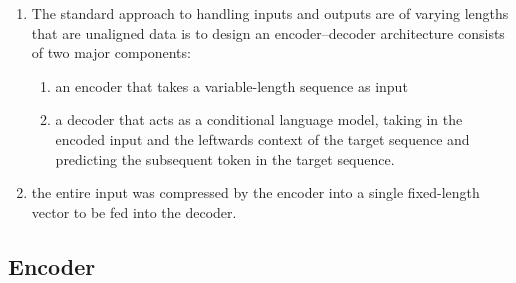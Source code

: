 \begin{enumerate}
    \item The standard approach to handling inputs and outputs are of varying lengths that are unaligned data is to design an encoder–decoder architecture consists of two major components: 
    \begin{enumerate}
        \item an encoder that takes a variable-length sequence as input
        
        \item a decoder that acts as a conditional language model, taking in the encoded input and the leftwards context of the target sequence and predicting the subsequent token in the target sequence.
    \end{enumerate}

    \item the entire input was compressed by the encoder into a single fixed-length vector to be fed into the decoder.     
\end{enumerate}




\subsection{Encoder \cite{dnn-1}} \label{rnn: Encoder}

